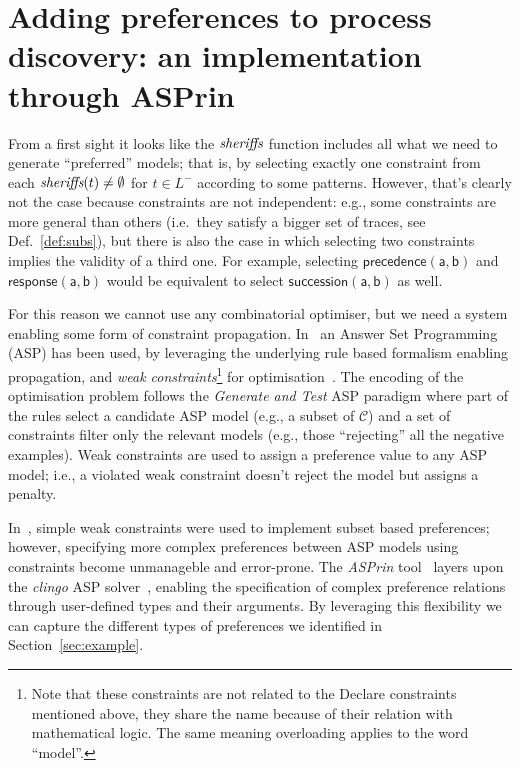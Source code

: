 
\section{Adding preferences to process discovery: an implementation through ASPrin}
\label{sec:tool}

From a first sight it looks like the ${\textit{sheriffs}}$ function includes all what we need to generate ``preferred'' models; that is, by selecting exactly one constraint from each ${\textit{sheriffs}}(t)\neq\emptyset$ for $t\in L^-$ according to some patterns. However, that's clearly not the case because constraints are not independent: e.g., some constraints are more general than others (i.e.\ they satisfy a bigger set of traces, see Def.~\ref{def:subs}), but there is also the case in which selecting two constraints implies the validity of a third one. For example, selecting $\mathsf{precedence(a,b)}$ and $\mathsf{response(a,b)}$ would be equivalent to select $\mathsf{succession(a,b)}$ as well.

For this reason we cannot use any combinatorial optimiser, but we need a system enabling some form of constraint propagation. In~\cite{deviant-tkde} an Answer Set Programming (ASP) has been used, by leveraging the underlying rule based formalism enabling propagation, and \emph{weak constraints}\footnote{Note that these constraints are not related to the Declare constraints mentioned above, they share the name because of their relation with mathematical logic. The same meaning overloading applies to the word ``model''.} for optimisation~\cite{asp-intro,clingo}. The encoding of the optimisation problem follows the \emph{Generate and Test} ASP paradigm where part of the rules select a candidate ASP model (e.g., a subset of $\mathcal{C}$) and a set of constraints filter only the relevant models (e.g., those ``rejecting'' all the negative examples). Weak constraints are used to assign a preference value to any ASP model; i.e., a violated weak constraint doesn't reject the model but assigns a penalty.

In~\cite{deviant-tkde}, simple weak constraints were used to implement subset based preferences; however, specifying more complex preferences between ASP models using constraints become unmanageble and error-prone. The \emph{ASPrin} tool~\cite{DBLP:conf/aaai/BrewkaD0S15} layers upon the \emph{clingo} ASP solver~\cite{clingo}, enabling the specification of complex preference relations through user-defined  types and their arguments. By leveraging this flexibility we can capture the different types of preferences we identified in Section~\ref{sec:example}.

